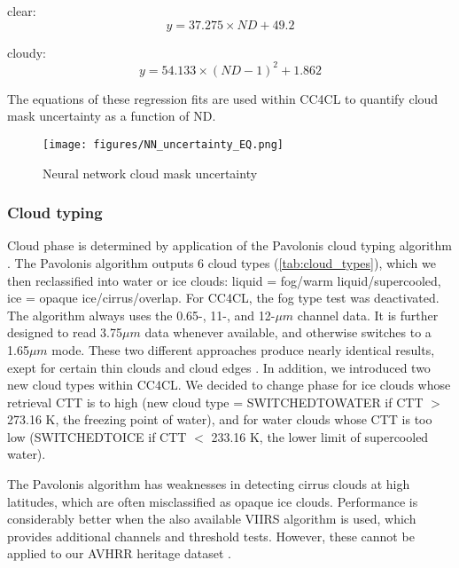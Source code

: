 clear:
\begin{equation}
  y = 37.275 \times ND + 49.2
\end{equation}

cloudy:
\begin{equation}
  y = 54.133 \times (ND-1)^2 + 1.862
\end{equation}

The equations of these regression fits are used within CC4CL to quantify cloud mask uncertainty as a function of ND.

\begin{figure}[h]
  \texttt{[image: figures/NN\_uncertainty\_EQ.png]}
  \caption{Neural network cloud mask uncertainty}
  \label{fig:NN_unc}
\end{figure}

\subsubsection{Cloud typing}\label{sec:Pavolonis}

Cloud phase is determined by application of the Pavolonis cloud typing algorithm \citep{Pavolonis05}. The Pavolonis algorithm outputs 6 cloud types (\cref{tab:cloud_types}), which we then reclassified into water or ice clouds: liquid = fog/warm liquid/supercooled, ice = opaque ice/cirrus/overlap. For CC4CL, the fog type test was deactivated. The algorithm always uses the 0.65-, 11-, and 12-$\mu m$ channel data. It is further designed to read 3.75$\mu m$ data whenever available, and otherwise switches to a 1.65$\mu m$ mode. These two different approaches produce nearly identical results, exept for certain thin clouds and cloud edges \citep{Pavolonis05}. In addition, we introduced two new cloud types within CC4CL. We decided to change phase for ice clouds whose retrieval CTT is to high (new cloud type = SWITCHED\textunderscore TO\textunderscore WATER if CTT $>$ 273.16 K, the freezing point of water), and for water clouds whose CTT is too low (SWITCHED\textunderscore TO\textunderscore ICE if CTT $<$ 233.16 K, the lower limit of supercooled water).

The Pavolonis algorithm has weaknesses in detecting cirrus clouds at high latitudes, which are often misclassified as opaque ice clouds. Performance is considerably better when the also available VIIRS algorithm is used, which provides additional channels and threshold tests. However, these cannot be applied to our AVHRR heritage dataset \citep{Pavolonis05}.

